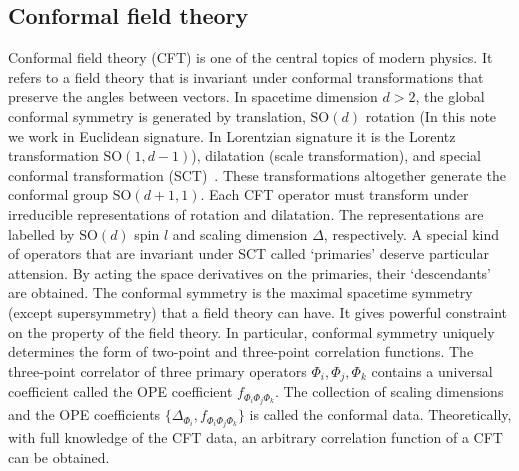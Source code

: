 \documentclass{timesjhep}
\begin{document}
\subsection{Conformal field theory}

Conformal field theory (CFT) is one of the central topics of modern physics. It refers to a field theory that is invariant under conformal transformations that preserve the angles between vectors. In spacetime dimension $d>2$, the global conformal symmetry is generated by translation, $\mathrm{SO}(d)$ rotation (In this note we work in Euclidean signature. In Lorentzian signature it is the Lorentz transformation $\mathrm{SO}(1,d-1)$), dilatation (scale transformation), and special conformal transformation (SCT)~\cite{Rychkov2016CFT,SimmonsDuffin2016CFT}. These transformations altogether generate the conformal group $\mathrm{SO}(d+1,1)$. Each CFT operator must transform under irreducible representations of rotation and dilatation. The representations are labelled by $\mathrm{SO}(d)$ spin $l$ and scaling dimension $\Delta$, respectively. A special kind of operators that are invariant under SCT called `primaries' deserve particular attension. By acting the space derivatives on the primaries, their `descendants' are obtained. The conformal symmetry is the maximal spacetime symmetry (except supersymmetry) that a field theory can have. It gives powerful constraint on the property of the field theory. In particular, conformal symmetry uniquely determines the form of two-point and three-point correlation functions. The three-point correlator of three primary operators $\Phi_i,\Phi_j,\Phi_k$ contains a universal coefficient called the OPE coefficient $f_{\Phi_i\Phi_j\Phi_k}$. The collection of scaling dimensions and the OPE coefficients $\{\Delta_{\Phi_i},f_{\Phi_i\Phi_j\Phi_k}\}$ is called the conformal data. Theoretically, with full knowledge of the CFT data, an arbitrary correlation function of a CFT can be obtained. 
\end{document}
